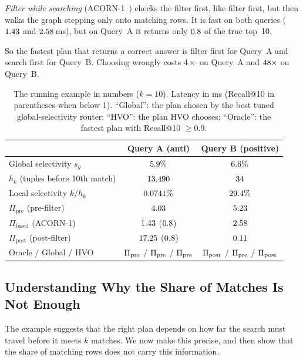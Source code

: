 \documentclass[sigconf,nonacm]{acmart}
\newcommand{\Ppre}{\Pi_{\text{pre}}}
\newcommand{\Pfus}{\Pi_{\text{fused}}}
\newcommand{\Ppost}{\Pi_{\text{post}}}
\begin{document}
\emph{Filter while searching} (ACORN-1~\cite{patel2024acorn}) checks the filter first, like filter first, but then walks the graph stepping only onto matching rows. It is fast on both queries ($1.43$ and $2.58$\,ms), but on Query~A it returns only $0.8$ of the true top~10.

So the fastest plan that returns a correct answer is filter first for Query~A and search first for Query~B. Choosing wrongly costs $4\times$ on Query~A and $48\times$ on Query~B.

\begin{table}[!t]
\footnotesize
\centering
\caption{The running example in numbers ($k=10$). Latency in ms (Recall@10 in parentheses when below 1). ``Global'': the plan chosen by the best tuned global-selectivity router; ``HVO'': the plan HVO chooses; ``Oracle'': the fastest plan with Recall@10 $\ge0.9$.}
\label{tab:example}
\setlength{\tabcolsep}{3pt}
\begin{tabular}{lcc}
\toprule
 & Query A (anti) & Query B (positive) \\
\midrule
Global selectivity $s_g$ & $5.9\%$ & $6.6\%$ \\
$h_k$ (tuples before 10th match) & $13{,}490$ & $34$ \\
Local selectivity $k/h_k$ & $0.0741\%$ & $29.4\%$ \\
\midrule
$\Ppre$ (pre-filter) & $4.03$ & $5.23$ \\
$\Pfus$ (ACORN-1) & $1.43$ ($0.8$) & $2.58$ \\
$\Ppost$ (post-filter) & $17.25$ ($0.8$) & $0.11$ \\
\midrule
Oracle / Global / HVO & $\ExAOracle$ / $\ExAGlobal$ / $\ExAHvo$ & $\ExBOracle$ / $\ExBGlobal$ / $\ExBHvo$ \\
\bottomrule
\end{tabular}
\end{table}

\subsection{Understanding Why the Share of Matches Is Not Enough}\label{sec:understanding}\label{sec:formulation}
The example suggests that the right plan depends on how far the search must travel before it meets $k$ matches. We now make this precise, and then show that the share of matching rows does not carry this information.
\end{document}
